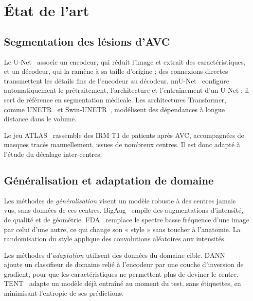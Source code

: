 \documentclass[11pt,a4paper]{report}
\begin{document}
\chapter{État de l'art}
\label{chap:etat}

\section{Segmentation des lésions d'AVC}

Le U-Net~\cite{ronneberger2015} associe un encodeur, qui réduit l'image et
extrait des caractéristiques, et un décodeur, qui la ramène à sa taille
d'origine ; des connexions directes transmettent les détails fins de
l'encodeur au décodeur. nnU-Net~\cite{isensee2021} configure
automatiquement le prétraitement, l'architecture et l'entraînement d'un
U-Net ; il sert de référence en segmentation médicale. Les architectures
Transformer, comme UNETR~\cite{hatamizadeh2022} et
Swin-UNETR~\cite{hatamizadeh2022swin}, modélisent des dépendances à longue
distance dans le volume.

Le jeu ATLAS~\cite{liew2018,liew2022} rassemble des IRM T1 de patients après
AVC, accompagnées de masques tracés manuellement, issues de nombreux centres.
Il est donc adapté à l'étude du décalage inter-centres.

\section{Généralisation et adaptation de domaine}

Les méthodes de \emph{généralisation} visent un modèle robuste à des centres
jamais vus, sans données de ces centres. BigAug~\cite{zhang2020} empile des
augmentations d'intensité, de qualité et de géométrie. FDA~\cite{yang2020}
remplace le spectre basse fréquence d'une image par celui d'une autre, ce qui
change son « style » sans toucher à l'anatomie. La randomisation du style
applique des convolutions aléatoires aux intensités.

Les méthodes d'\emph{adaptation} utilisent des données du domaine cible.
DANN~\cite{ganin2016} ajoute un classifieur de domaine relié à l'encodeur par
une couche d'inversion de gradient, pour que les caractéristiques ne
permettent plus de deviner le centre. TENT~\cite{wang2021} adapte un modèle
déjà entraîné au moment du test, sans étiquettes, en minimisant l'entropie
de ses prédictions.
\end{document}
